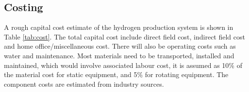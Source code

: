 \documentclass[11pt, a4paper]{article}
\begin{document}


\subsection{Costing}
A rough capital cost estimate of the hydrogen production system is shown in Table \ref{tab:cost}. The total capital cost include direct field cost, indirect field cost and home office/miscellaneous cost. There will also be operating costs such as water and maintenance. Most materials need to be transported, installed and maintained, which would involve associated labour cost, it is assumed as 10\% of the material cost for static equipment, and 5\% for rotating equipment. The component costs are estimated from industry sources.\cite{cost} \cite{cost2} \cite{cost3}
\end{document}
